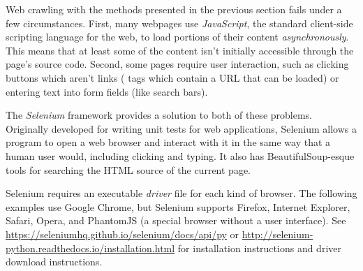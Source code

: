 Web crawling with the methods presented in the previous section fails under a few circumstances.
First, many webpages use \emph{JavaScript}, the standard client-side scripting language for the web, to load portions of their content  \emph{asynchronously}.
This means that at least some of the content isn't initially accessible through the page's source code.
Second, some pages require user interaction, such as clicking buttons which aren't links ( tags which contain a URL that can be loaded) or entering text into form fields (like search bars).

\begin{comment} %
Navigate to the website \url{http://www.simplesoccerstats.com/stats/teamstats.php?lge=14&type=goals&season=0}.
Notice that there is a row for the Chicago team displayed in the browser.
Open up the page source,
Hit \li{ctrl+f} and search for ``Chicago''.
Notice that it isn't there.
The following code will produce a similar result:

\begin{lstlisting}
>>> soccer_url = 'http://www.simplesoccerstats.com/stats/teamstats.php?lge=14&type=goals&season=0'
>>> soccer_content = requests.get(soccer_url).text
>>> soccer_soup = BeautifulSoup(soccer_content)

>>> print(soccer_soup.find(string='Chicago'))
<<None>>
\end{lstlisting}
Still nothing.
This means the actual table of information is loaded asynchronously.
\end{comment}

The \emph{Selenium} framework provides a solution to both of these problems.
Originally developed for writing unit tests for web applications, Selenium allows a program to open a web browser and interact with it in the same way that a human user would, including clicking and typing.
It also has BeautifulSoup-esque tools for searching the HTML source of the current page.


\begin{info} %
Selenium requires an executable \emph{driver} file for each kind of browser.
The following examples use Google Chrome, but Selenium supports Firefox, Internet Explorer, Safari, Opera, and PhantomJS (a special browser without a user interface).
See \url{https://seleniumhq.github.io/selenium/docs/api/py} or \url{http://selenium-python.readthedocs.io/installation.html} for installation instructions and driver download instructions.
\end{info}

